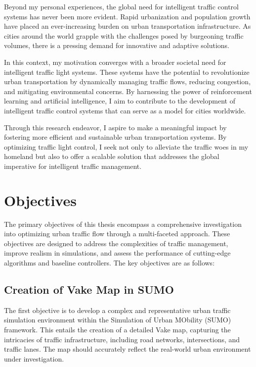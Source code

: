 Beyond my personal experiences, the global need for intelligent traffic control systems has never been more evident. Rapid urbanization and population growth have placed an ever-increasing burden on urban transportation infrastructure. As cities around the world grapple with the challenges posed by burgeoning traffic volumes, there is a pressing demand for innovative and adaptive solutions.

In this context, my motivation converges with a broader societal need for intelligent traffic light systems. These systems have the potential to revolutionize urban transportation by dynamically managing traffic flows, reducing congestion, and mitigating environmental concerns. By harnessing the power of reinforcement learning and artificial intelligence, I aim to contribute to the development of intelligent traffic control systems that can serve as a model for cities worldwide.

Through this research endeavor, I aspire to make a meaningful impact by fostering more efficient and sustainable urban transportation systems. By optimizing traffic light control, I seek not only to alleviate the traffic woes in my homeland but also to offer a scalable solution that addresses the global imperative for intelligent traffic management.


\section{Objectives}
The primary objectives of this thesis encompass a comprehensive investigation into optimizing urban traffic flow through a multi-faceted approach. These objectives are designed to address the complexities of traffic management, improve realism in simulations, and assess the performance of cutting-edge algorithms and baseline controllers. The key objectives are as follows:

\subsection{Creation of Vake Map in SUMO}
The first objective is to develop a complex and representative urban traffic simulation environment within the Simulation of Urban MObility (SUMO) framework. This entails the creation of a detailed Vake map, capturing the intricacies of traffic infrastructure, including road networks, intersections, and traffic lanes. The map should accurately reflect the real-world urban environment under investigation.

